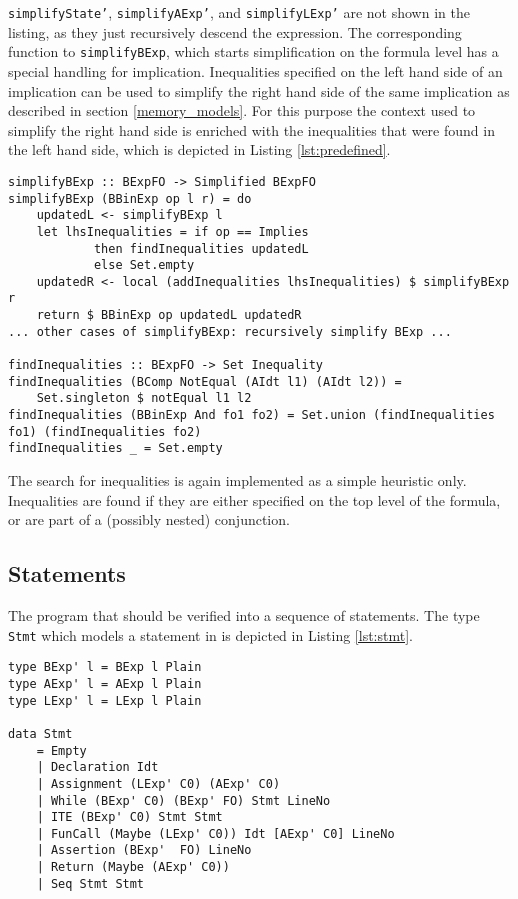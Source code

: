 \documentclass[12pt]{article}
\begin{document}
\texttt{simplifyState'}, \texttt{simplifyAExp'}, and \texttt{simplifyLExp'} are not shown in the listing, as they just recursively descend the expression.
The corresponding function to \texttt{simplifyBExp}, which starts simplification on the formula level has a special handling for implication. 
Inequalities specified on the left hand side of an implication can be used to simplify the right hand side of the same implication as described in section \ref{memory_models}.
For this purpose the context used to simplify the right hand side is enriched with the inequalities that were found in the left hand side, which is depicted in Listing \ref{lst:predefined}.

\begin{lstlisting}[style=c0, caption=searching for predefined inequalities, label=lst:predefined]
simplifyBExp :: BExpFO -> Simplified BExpFO
simplifyBExp (BBinExp op l r) = do
    updatedL <- simplifyBExp l
    let lhsInequalities = if op == Implies 
            then findInequalities updatedL 
            else Set.empty
    updatedR <- local (addInequalities lhsInequalities) $ simplifyBExp r
    return $ BBinExp op updatedL updatedR
... other cases of simplifyBExp: recursively simplify BExp ...

findInequalities :: BExpFO -> Set Inequality
findInequalities (BComp NotEqual (AIdt l1) (AIdt l2)) = 
    Set.singleton $ notEqual l1 l2
findInequalities (BBinExp And fo1 fo2) = Set.union (findInequalities fo1) (findInequalities fo2)
findInequalities _ = Set.empty
\end{lstlisting}

The search for inequalities is again implemented as a simple heuristic only.
Inequalities are found if they are either specified on the top level of the formula, or are part of a (possibly nested) conjunction.

\subsection{Statements}

The program that should be verified into a sequence of statements.
The type \texttt{Stmt} which models a statement in \verifyc is depicted in Listing \ref{lst:stmt}.

\begin{minipage}{\linewidth}
\begin{lstlisting}[style=c0, caption=Stmt, label=lst:stmt]
type BExp' l = BExp l Plain
type AExp' l = AExp l Plain
type LExp' l = LExp l Plain
    
data Stmt 
    = Empty
    | Declaration Idt
    | Assignment (LExp' C0) (AExp' C0)
    | While (BExp' C0) (BExp' FO) Stmt LineNo
    | ITE (BExp' C0) Stmt Stmt
    | FunCall (Maybe (LExp' C0)) Idt [AExp' C0] LineNo
    | Assertion (BExp'  FO) LineNo
    | Return (Maybe (AExp' C0))
    | Seq Stmt Stmt
\end{lstlisting}
\end{minipage}
\end{document}
